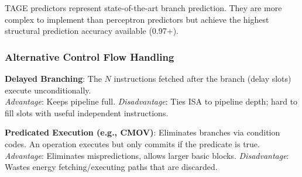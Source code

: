 \begin{remark}
	TAGE predictors represent state-of-the-art branch prediction. They are more complex to implement than perceptron predictors but achieve the highest structural prediction accuracy available (0.97+).
\end{remark}

\subsubsection{Alternative Control Flow Handling}

\begin{definition}
	\textbf{Delayed Branching}: The $N$ instructions fetched after the branch (delay slots) execute unconditionally. \\
	\textit{Advantage}: Keeps pipeline full. \textit{Disadvantage}: Ties ISA to pipeline depth; hard to fill slots with useful independent instructions.
\end{definition}

\begin{definition}
	\textbf{Predicated Execution (e.g., CMOV)}: Eliminates branches via condition codes. An operation executes but only commits if the predicate is true.\\
	\textit{Advantage}: Eliminates mispredictions, allows larger basic blocks. \textit{Disadvantage}: Wastes energy fetching/executing paths that are discarded.
\end{definition}

